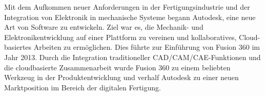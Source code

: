 Mit dem Aufkommen neuer Anforderungen in der Fertigungsindustrie und der Integration von Elektronik in mechanische Systeme begann Autodesk, eine neue Art von Software zu entwickeln. Ziel war es, die Mechanik- und Elektronikentwicklung auf einer Plattform zu vereinen und kollaboratives, Cloud-basiertes Arbeiten zu ermöglichen. Dies führte zur Einführung von Fusion 360 im Jahr 2013. \autocite{wikipedia_autodesk_deutsch}
Durch die Integration traditioneller CAD/CAM/CAE-Funktionen und die cloudbasierte Zusammenarbeit wurde Fusion 360 zu einem beliebten Werkzeug in der Produktentwicklung und verhalf Autodesk zu einer neuen Marktposition im Bereich der digitalen Fertigung.

